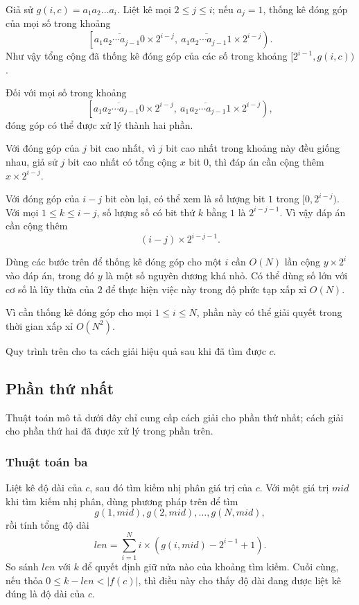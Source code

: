 \documentclass[11pt]{article}
\begin{document}
Giả sử \(g(i,c)=a_1a_2\ldots a_i\). Liệt kê mọi \(2\le j\le i\); nếu
\(a_j=1\), thống kê đóng góp của mọi số trong khoảng
\[
\left[
\overline{a_1a_2\cdots a_{j-1}0}\times 2^{i-j},\
\overline{a_1a_2\cdots a_{j-1}1}\times 2^{i-j}
\right).
\]
Như vậy tổng cộng đã thống kê đóng góp của các số trong khoảng
\([2^{i-1},g(i,c))\).

Đối với mọi số trong khoảng
\[
\left[
\overline{a_1a_2\cdots a_{j-1}0}\times 2^{i-j},\
\overline{a_1a_2\cdots a_{j-1}1}\times 2^{i-j}
\right),
\]
đóng góp có thể được xử lý thành hai phần.

Với đóng góp của \(j\) bit cao nhất, vì \(j\) bit cao nhất trong khoảng này đều
giống nhau, giả sử \(j\) bit cao nhất có tổng cộng \(x\) bit 0, thì đáp án cần
cộng thêm \(x\times 2^{i-j}\).

Với đóng góp của \(i-j\) bit còn lại, có thể xem là số lượng bit \(1\) trong
\([0,2^{i-j})\). Với mọi \(1\le k\le i-j\), số lượng số có bit thứ \(k\) bằng
\(1\) là \(2^{i-j-1}\). Vì vậy đáp án cần cộng thêm
\[
(i-j)\times 2^{i-j-1}.
\]

Dùng các bước trên để thống kê đóng góp cho một \(i\) cần \(O(N)\) lần cộng
\(y\times 2^i\) vào đáp án, trong đó \(y\) là một số nguyên dương khá nhỏ. Có
thể dùng số lớn với cơ số là lũy thừa của \(2\) để thực hiện việc này trong độ
phức tạp xấp xỉ \(O(N)\).

Vì cần thống kê đóng góp cho mọi \(1\le i\le N\), phần này có thể giải quyết
trong thời gian xấp xỉ \(O(N^2)\).

Quy trình trên cho ta cách giải hiệu quả sau khi đã tìm được \(c\).

\subsection{Phần thứ nhất}

Thuật toán mô tả dưới đây chỉ cung cấp cách giải cho phần thứ nhất; cách giải
cho phần thứ hai đã được xử lý trong phần trên.

\subsubsection{Thuật toán ba}

Liệt kê độ dài của \(c\), sau đó tìm kiếm nhị phân giá trị của \(c\). Với một
giá trị \(\mathit{mid}\) khi tìm kiếm nhị phân, dùng phương pháp trên để tìm
\[
g(1,\mathit{mid}),g(2,\mathit{mid}),\ldots,g(N,\mathit{mid}),
\]
rồi tính tổng độ dài
\[
\mathit{len}=\sum_{i=1}^{N}
i\times\left(g(i,\mathit{mid})-2^{i-1}+1\right).
\]
So sánh \(\mathit{len}\) với \(k\) để quyết định giữ nửa nào của khoảng tìm
kiếm. Cuối cùng, nếu thỏa \(0\le k-\mathit{len}<|f(c)|\), thì điều này cho thấy
độ dài đang được liệt kê đúng là độ dài của \(c\).
\end{document}

